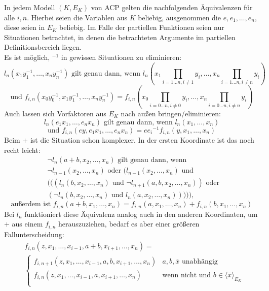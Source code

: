     \begin{fact}\label{Eliminierungsregeln}
    	In jedem Modell $(K,E_K)$ von ACP gelten die nachfolgenden Äquivalenzen für alle $i,n$. Hierbei seien die Variablen aus $K$ beliebig, ausgenommen die $e,e_1,\dots,e_n$, diese seien in $E_K$ beliebig. Im Falle der partiellen Funktionen seien nur Situationen betrachtet, in denen die betrachteten Argumente im partiellen Definitionsbereich liegen.\\
    	Es ist möglich, \glqq{}$^{-1}$\grqq{} in gewissen Situationen zu eliminieren:
    	$$l_n(x_1y_1^{-1},\dots,x_ny_n^{-1})\text{ gilt genau dann, wenn }l_n\left(x_1\prod\limits_{i=1\dots n,i\neq 1}y_i,\dots,x_n\prod\limits_{i=1\dots n,i\neq n}y_i\right)$$
    	$$\text{und }f_{i,n}(x_0y_0^{-1},x_1y_1^{-1},\dots,x_ny_n^{-1})= f_{i,n}\left(x_0\prod\limits_{i=0\dots n,i\neq 0}y_i,\dots,x_n\prod\limits_{i=0\dots n,i\neq n}y_i\right)$$
    	Auch lassen sich Vorfaktoren aus $E_K$ nach außen bringen/eliminieren:
    	$$l_n(e_1x_1,\dots,e_nx_n)\text{ gilt genau dann, wenn }l_n(x_1,\dots,x_n)$$
    	$$\text{und }f_{i,n}(ey,e_1x_1,\dots,e_nx_n)=e{e_i}^{-1}f_{i,n}(y,x_1,\dots,x_n)$$
    	Beim \glqq{}$+$\grqq{} ist die Situation schon komplexer. In der ersten Koordinate ist das noch recht leicht:
    	\begin{align*}
    	&\neg l_n(a+b,x_2,\dots,x_n)\text{ gilt genau dann, wenn }\\&\neg l_{n-1}(x_2,\dots,x_n)\text{ oder }(l_{n-1}(x_2,\dots,x_n)\text{ und }\\&(((l_n(b,x_2,\dots,x_n)\text{ und }\neg l_{n+1}(a,b,x_2,\dots,x_n))\text{ oder }\\&(\neg l_n(b,x_2,\dots,x_n)\text{ und }l_n(a,x_2,\dots,x_n))))),
    	\end{align*}
    	$$\text{außerdem ist }f_{i,n}(a+b,x_1,\dots,x_n)=f_{i,n}(a,x_1,\dots,x_n)+f_{i,n}(b,x_1,\dots,x_n)$$\newpage
    	Bei $l_n$ funktioniert diese Äquivalenz analog auch in den anderen Koordinaten, um \glqq{}$+$\grqq{} aus einem $f_{i,n}$ herauszuziehen, bedarf es aber einer größeren Fallunterscheidung:
    	\begin{align*}
    	&f_{i,n}(z,x_1,\dots,x_{i-1},a+b,x_{i+1},\dots,x_n)=\\
    	&\left\{\begin{array}{ll}
    	f_{i,n+1}(z,x_1,\dots,x_{i-1},a,b,x_{i+1},\dots,x_n)& a,b,\overline{x}\text{ unabhängig}\\
    	f_{i,n}(z,x_1,\dots,x_{i-1},a,x_{i+1},\dots,x_n)&\text{wenn nicht und }b\in\langle\overline{x}\rangle_{E_K}\\

\end{array}
\end{align*}
\end{fact}
